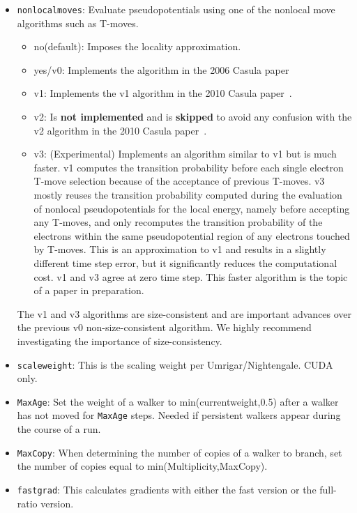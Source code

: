 \begin{itemize}
\item \texttt{nonlocalmoves}: Evaluate pseudopotentials using one of the nonlocal move algorithms such as T-moves.
\begin{itemize}
\item no(default): Imposes the locality approximation.
\item yes/v0: Implements the algorithm in the 2006 Casula paper~\cite{Casula2006}
\item v1: Implements the v1 algorithm in the 2010 Casula paper~\cite{Casula2010}.
\item v2: Is \textbf{not implemented} and is \textbf{skipped} to avoid any confusion with the v2 algorithm in the 2010 Casula paper~\cite{Casula2010}.
\item v3: (Experimental) Implements an algorithm similar to v1 but is much faster. v1 computes the transition probability before each single electron T-move selection because of the acceptance of previous T-moves. v3 mostly reuses the transition probability computed during the evaluation of nonlocal pseudopotentials for the local energy, namely before accepting any T-moves, and only recomputes the transition probability of the electrons within the same pseudopotential region of any electrons touched by T-moves. This is an approximation to v1 and results in a slightly different time step error, but it significantly reduces the computational cost. v1 and v3 agree at zero time step. This faster algorithm is the topic of a paper in preparation.
\end{itemize}
The v1 and v3 algorithms are size-consistent and are important advances over the previous v0 non-size-consistent algorithm. We highly recommend investigating the importance of size-consistency.

\item \texttt{scaleweight}: This is the scaling weight per Umrigar/Nightengale.  CUDA only.

\item \texttt{MaxAge}: Set the weight of a walker to min(currentweight,0.5) after a walker has not moved for \texttt{MaxAge} steps.  Needed if persistent walkers appear during the course of a run.

\item \texttt{MaxCopy}: When determining the number of copies of a walker to branch, set the number of copies equal to min(Multiplicity,MaxCopy).

\item \texttt{fastgrad}: This calculates gradients with either the fast version or the full-ratio version.


\end{itemize}
